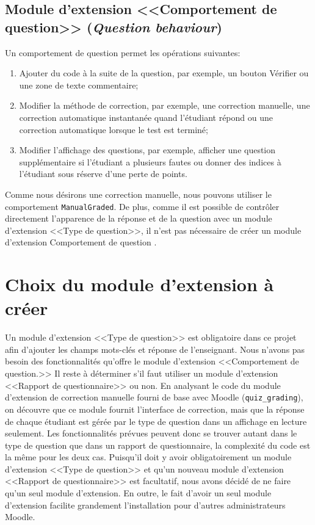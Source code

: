 \subsection{Module d'extension <<Comportement de question>> (\textit{Question behaviour})}
Un comportement de question permet les op\'erations suivantes:
\begin{enumerate}
  \item Ajouter du code \`a la suite de la question, par exemple, un bouton \og V\'erifier \fg{} ou une zone de texte commentaire;
  
  \item Modifier la m\'ethode de correction, par exemple, une correction manuelle, une correction automatique instantan\'ee quand l'\'etudiant r\'epond ou une correction automatique lorsque le test est termin\'e;
  
  \item Modifier l'affichage des questions, par exemple, afficher une question suppl\'ementaire si l'\'etudiant a plusieurs fautes ou donner des indices \`a l'\'etudiant sous r\'eserve d'une perte de points.
\end{enumerate}
Comme nous d\'esirons une correction manuelle, nous pouvons utiliser le comportement \texttt{ManualGraded}.
De plus, comme il est possible de contr\^oler directement l'apparence de la r\'eponse et de la question avec un module d'extension <<Type de question>>, il n'est pas n\'ecessaire de cr\'eer un module d'extension \og Comportement de question \fg{}.

\section{Choix du module d'extension \`a cr\'eer}
Un module d'extension <<Type de question>> est obligatoire dans ce projet afin d'ajouter les champs mots-cl\'es et r\'eponse de l'enseignant.
Nous n'avons pas besoin des fonctionnalit\'es qu'offre le module d'extension <<Comportement de question.>>
Il reste \`a d\'eterminer s'il faut utiliser un module d'extension <<Rapport de questionnaire>> ou non.
En analysant le code du module d'extension de correction manuelle fourni de base avec Moodle (\texttt{quiz\_grading}), on d\'ecouvre que ce module fournit l'interface de correction, mais que la r\'eponse de chaque \'etudiant est g\'er\'ee par le type de question dans un affichage en lecture seulement.
Les fonctionnalit\'es pr\'evues peuvent donc se trouver autant dans le type de question que dans un rapport de questionnaire, la complexit\'e du code est la m\^eme pour les deux cas.
Puisqu'il doit y avoir obligatoirement un module d'extension <<Type de question>> et qu'un nouveau module d'extension <<Rapport de questionnaire>> est facultatif, nous avons d\'ecid\'e de ne faire qu'un seul module d'extension.
En outre, le fait d'avoir un seul module d'extension facilite grandement l'installation pour d'autres administrateurs Moodle.
